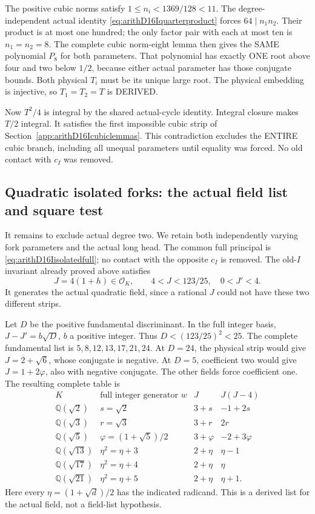 The positive cubic norms satisfy
\(1\le n_i<1369/128<11\).
The degree-independent actual identity
\eqref{eq:arithD16Iquarterproduct}
forces \(64\mid n_1n_2\).
Their product is at most one hundred;
the only factor pair with each at
most ten is \(n_1=n_2=8\).
The complete cubic norm-eight lemma
then gives the SAME polynomial \(P_8\)
for both parameters.
That polynomial has exactly ONE root
above four and two below \(1/2\),
because either actual parameter has
those conjugate bounds.
Both physical \(T_i\) must be its
unique large root.
The physical embedding is injective,
so \(T_1=T_2=T\) is DERIVED.

Now \(T^2/4\) is integral by the
shared actual-cycle identity.
Integral closure makes \(T/2\) integral.
It satisfies the first impossible
cubic strip of
Section~\ref{app:arithD16Icubiclemmas}.
This contradiction excludes the ENTIRE
cubic branch, including all unequal
parameters until equality was forced.
No old contact with \(c_I\) was removed.

\subsection{Quadratic isolated forks: the actual field list and square test}
\label{app:arithD16Iquadraticfields}

It remains to exclude actual degree two.
We retain both independently varying fork
parameters and the actual long head.
The common full principal is
\eqref{eq:arithD16Iisolatedfull}; no contact
with the opposite \(c_I\) is removed.
The old-\(I\) invariant already proved
above satisfies
\[
 J=4(1+h)\in\mathcal O_K,\qquad
                  4<J<123/25,\quad0<J'<4 .
\]
It generates the actual quadratic
field, since a rational \(J\) could
not have these two different strips.

Let \(D\) be the positive fundamental
discriminant.
In the full integer basis,
\(J-J'=b\sqrt D\), \(b\) a positive
integer.
Thus \(D<(123/25)^2<25\).
The complete fundamental list is
\(5,8,12,13,17,21,24\).
At \(D=24\), the physical strip would
give \(J=2+\sqrt6\), whose conjugate
is negative.
At \(D=5\), coefficient two would
give \(J=1+2\varphi\), also with
negative conjugate.
The other fields force coefficient
one.
The resulting complete table is
\[
\begin{array}{c|c|c|c}
 K&\text{full integer generator }w&J&J(J-4)\\ \hline
 \mathbb Q(\sqrt2)&s=\sqrt2&3+s&-1+2s\\
 \mathbb Q(\sqrt3)&r=\sqrt3&3+r&2r\\
 \mathbb Q(\sqrt5)&\varphi=(1+\sqrt5)/2&3+\varphi&-2+3\varphi\\
 \mathbb Q(\sqrt{13})&\eta^2=\eta+3&2+\eta&\eta-1\\
 \mathbb Q(\sqrt{17})&\eta^2=\eta+4&2+\eta&\eta\\
 \mathbb Q(\sqrt{21})&\eta^2=\eta+5&2+\eta&\eta+1 .
\end{array}
\]
Here every \(\eta=(1+\sqrt d)/2\)
has the indicated radicand.
This is a derived list for the
actual field, not a field-list
hypothesis.

